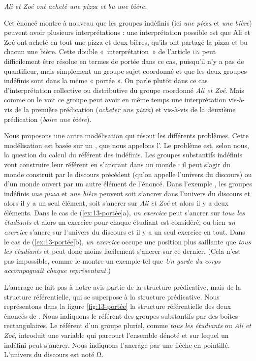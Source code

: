 {\ea\label{ex:13-pizza} \textit{Ali et Zoé ont acheté une pizza et bu une bière.}\z

Cet énoncé montre à nouveau que les groupes indéfinis (ici \textit{une pizza} et \textit{une bière}) peuvent avoir plusieurs interprétations : une interprétation possible est que Ali et Zoé ont acheté en tout une pizza et deux bières, qu’ils ont partagé la pizza et bu chacun une bière. Cette double «~interprétation~» de l’article \textsc{un} peut difficilement être résolue en termes de portée dans ce cas, puisqu’il n’y a pas de quantifieur, mais simplement un groupe sujet coordonné et que les deux groupes indéfinis sont dans la même « portée ». On parle plutôt dans ce cas d’interprétation collective ou distributive du groupe coordonné \textit{Ali et Zoé}. Mais comme on le voit ce groupe peut avoir en même temps une interprétation  vis-à-vis de la première prédication (\textit{acheter une pizza}) et  vis-à-vis de la deuxième prédication (\textit{boire une bière}).

Nous proposons une autre modélisation qui résout les différents problèmes. Cette modélisation est basée sur un , que nous appelons l’. Le problème est, selon nous, la question du calcul du référent des indéfinis. Les groupes substantifs indéfinis vont construire leur référent en s’ancrant dans un monde : il peut s’agir du monde construit par le discours précédent (qu’on appelle l’univers du discours) ou d’un monde ouvert par un autre élément de l’énoncé. Dans l’exemple , les groupes indéfinis \textit{une pizza} et \textit{une bière} peuvent soit s’ancrer dans l’univers du discours et alors il y a un seul élément, soit s’ancrer sur \textit{Ali et Zoé} et alors il y a deux éléments. Dans le cas de (\ref{ex:13-portée}a), \textit{un exercice} peut s’ancrer sur \textit{tous les étudiants} et alors un exercice pour chaque étudiant est considéré, ou bien \textit{un exercice} s’ancre sur l’univers du discours et il y a un seul exercice en tout. Dans le cas de (\ref{ex:13-portée}b), \textit{un exercice} occupe une position plus saillante que \textit{tous les étudiants} et peut donc moins facilement s’ancrer sur ce dernier. (Cela n’est pas impossible, comme le montre un exemple tel que \textit{Un garde du corps accompagnait chaque représentant.}) 

L’ancrage ne fait pas à notre avis partie de la structure prédicative, mais de la structure référentielle, qui se superpose à la structure prédicative. Nous représentons dans la figure \ref{fig:13-portée} la structure référentielle des deux énoncés de . Nous indiquons le référent des groupes substantifs par des boîtes rectangulaires. Le référent d’un groupe pluriel, comme \textit{tous les étudiants} ou \textit{Ali et Zoé}, introduit une variable qui parcourt l’ensemble dénoté et sur lequel un indéfini peut s’ancrer. Nous indiquons l’ancrage par une flèche en pointillé. L’univers du discours est noté Ω.

}
